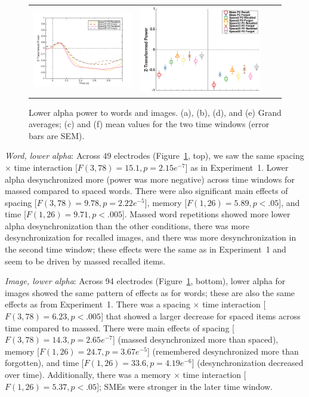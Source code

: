 \begin{figure}[H]
\begin{tabular}{cccc}
  \includegraphics[width=.30\textwidth]{./figs/exp2/tfr_line/tfr_line_ga_img_rc_spac12_p2_img_fo_spac12_p2_img_rc_spac32_p2_img_fo_spac32_p2_8_10_-100_1000_94ROIs_legend} &
  \includegraphics[width=.30\textwidth]{./figs/exp2/tfr_avg/tfr_avg_ga_img_rc_mass_p2_img_fo_mass_p2_img_rc_spac2_p2_img_fo_spac2_p2_img_rc_spac12_p2_img_fo_spac12_p2_img_rc_spac32_p2_img_fo_spac32_p2_8_10_0_500_500_1000_94ROI_ylabel} \\
  \end{tabular}
  \caption{Lower alpha power to words and images.  (a), (b), (d), and (e) Grand averages; (c) and (f) mean values for the two time windows (error bars are SEM).}
  \label{fig:s2_word_img_alpha_low}
\end{figure}


\textit{Word, lower alpha}: Across 49 electrodes (Figure~\ref{fig:s2_word_img_alpha_low}, top), we saw the same spacing $\times$ time interaction [$F(3,78)=15.1, p=2.15e^{-7}$] as in Experiment~1.  Lower alpha desynchronized more (power was more negative) across time windows for massed compared to spaced words.  There were also significant main effects of spacing [$F(3,78)=9.78, p=2.22e^{-5}$], memory [$F(1,26)=5.89, p<.05$], and time [$F(1,26)=9.71, p<.005$].  Massed word repetitions showed more lower alpha desynchronization than the other conditions, there was more desynchronization for recalled images, and there was more desynchronization in the second time window; these effects were the same as in Experiment~1 and seem to be driven by massed recalled items.


\textit{Image, lower alpha}: Across 94 electrodes (Figure~\ref{fig:s2_word_img_alpha_low}, bottom), lower alpha for images showed the same pattern of effects as for words; these are also the same effects as from Experiment~1.  There was a spacing $\times$ time interaction [$F(3,78)=6.23, p<.005$] that showed a larger decrease for spaced items across time compared to massed.  There were main effects of spacing [$F(3,78)=14.3, p=2.65e^{-7}$] (massed desynchronized more than spaced), memory [$F(1,26)=24.7, p=3.67e^{-5}$] (remembered desynchronized more than forgotten), and time [$F(1,26)=33.6, p=4.19e^{-6}$] (desynchronization decreased over time).  Additionally,  there was a memory $\times$ time interaction [$F(1,26)=5.37, p<.05$]; SMEs were stronger in the later time window.


